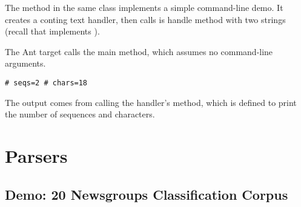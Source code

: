 The  method in the same class implements a simple
command-line demo.  It creates a conting text handler, then calls is
handle method with two strings (recall that  implements
).
%

The Ant target  calls the main method,
which assumes no command-line arguments.  
%
\begin{verbatim}
# seqs=2 # chars=18
\end{verbatim}
%
The output comes from calling the handler's 
method, which is defined to print the number of sequences
and characters.





\section{Parsers}




\subsection{Demo: 20 Newsgroups Classification Corpus}\label{section:20-news-corpus}

